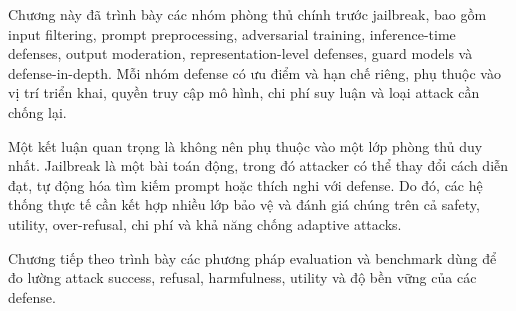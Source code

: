 Chương này đã trình bày các nhóm phòng thủ chính trước jailbreak, bao gồm
input filtering, prompt preprocessing, adversarial training,
inference-time defenses, output moderation, representation-level defenses,
guard models và defense-in-depth. Mỗi nhóm defense có ưu điểm và hạn chế
riêng, phụ thuộc vào vị trí triển khai, quyền truy cập mô hình, chi phí
suy luận và loại attack cần chống lại.

Một kết luận quan trọng là không nên phụ thuộc vào một lớp phòng thủ duy
nhất. Jailbreak là một bài toán động, trong đó attacker có thể thay đổi
cách diễn đạt, tự động hóa tìm kiếm prompt hoặc thích nghi với defense.
Do đó, các hệ thống thực tế cần kết hợp nhiều lớp bảo vệ và đánh giá chúng
trên cả safety, utility, over-refusal, chi phí và khả năng chống adaptive
attacks.

Chương tiếp theo trình bày các phương pháp evaluation và benchmark dùng để
đo lường attack success, refusal, harmfulness, utility và độ bền vững của
các defense.